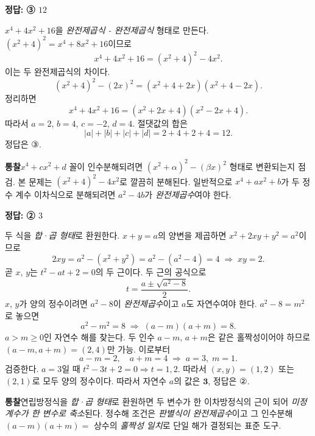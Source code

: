 \documentclass[10pt]{article}
\newcommand{\solnote}[1]{\par\smallskip\noindent
  \begin{tcolorbox}[enhanced, breakable, colback=vB-light, colframe=vB-light,
    boxrule=0pt, arc=3pt, left=10pt, right=10pt, top=4pt, bottom=4pt,
    fontupper=\sffamily\footnotesize\color{vB-ink}]
    \textbf{\color{vB-deep}통찰}\quad #1
  \end{tcolorbox}}
\begin{document}
\begin{answerbox}\sffamily\bfseries 정답: ③ $12$\end{answerbox}
 $x^4 + 4x^2 + 16$을 \emph{완전제곱식 - 완전제곱식} 형태로 만든다. $(x^2 + 4)^2 = x^4 + 8x^2 + 16$이므로
\[ x^4 + 4x^2 + 16 = (x^2 + 4)^2 - 4x^2. \]
 이는 두 완전제곱식의 차이다.
\[ (x^2 + 4)^2 - (2x)^2 = (x^2 + 4 + 2x)(x^2 + 4 - 2x). \]
 정리하면
\[ x^4 + 4x^2 + 16 = (x^2 + 2x + 4)(x^2 - 2x + 4). \]
따라서 $a = 2$, $b = 4$, $c = -2$, $d = 4$.
 절댓값의 합은
\[ |a| + |b| + |c| + |d| = 2 + 4 + 2 + 4 = 12. \]
정답은 $\textbf{③}$.
\solnote{$x^4 + cx^2 + d$ 꼴이 인수분해되려면 \emph{$(x^2+\alpha)^2 - (\beta x)^2$} 형태로 변환되는지 점검. 본 문제는 $(x^2+4)^2 - 4x^2$로 깔끔히 분해된다. 일반적으로 $x^4 + ax^2 + b$가 두 정수 계수 이차식으로 분해되려면 $a^2 - 4b$가 \emph{완전제곱수}여야 한다.}

\begin{answerbox}\sffamily\bfseries 정답: ② $3$\end{answerbox}
 두 식을 \emph{합·곱 형태}로 환원한다. $x + y = a$의 양변을 제곱하면 $x^2 + 2xy + y^2 = a^2$이므로
\[ 2xy = a^2 - (x^2 + y^2) = a^2 - (a^2 - 4) = 4 \;\Longrightarrow\; xy = 2. \]
 곧 $x$, $y$는 $t^2 - at + 2 = 0$의 두 근이다. 두 근의 공식으로
\[ t = \frac{a \pm \sqrt{a^2 - 8}}{2}. \]
 $x$, $y$가 양의 정수이려면 $a^2 - 8$이 \emph{완전제곱수}이고 $a$도 자연수여야 한다. $a^2 - 8 = m^2$로 놓으면
\[ a^2 - m^2 = 8 \;\Longrightarrow\; (a - m)(a + m) = 8. \]
 $a > m \ge 0$인 자연수 해를 찾는다. 두 인수 $a - m$, $a + m$은 같은 홀짝성이어야 하므로 $(a-m, a+m) = (2, 4)$만 가능. 이로부터
\[ a - m = 2, \quad a + m = 4 \;\Longrightarrow\; a = 3, \; m = 1. \]
 검증한다. $a = 3$일 때 $t^2 - 3t + 2 = 0 \Rightarrow t = 1, 2$. 따라서 $(x, y) = (1, 2)$ 또는 $(2, 1)$로 모두 양의 정수이다.
 따라서 자연수 $a$의 값은 $\textbf{3}$, 정답은 $\textbf{②}$.
\solnote{연립방정식을 \emph{합·곱 형태}로 환원하면 두 변수가 한 이차방정식의 근이 되어 \emph{미정계수가 한 변수로 축소}된다. 정수해 조건은 \emph{판별식이 완전제곱수}이고 그 인수분해 $(a-m)(a+m) = $ 상수의 \emph{홀짝성 일치}로 단일 해가 결정되는 표준 도구.}
\end{document}
